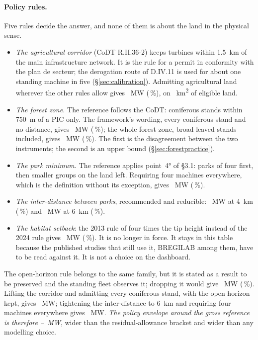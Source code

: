 \documentclass[11pt,a4paper]{article}
\begin{document}
\paragraph{Policy rules.} Five rules decide the answer, and none of them is
about the land in the physical sense.

\begin{itemize}
  \item \emph{The agricultural corridor} (CoDT R.II.36-2) keeps turbines within
    \SI{1.5}{\kilo\metre} of the main infrastructure network. It is the rule for
    a permit in conformity with the plan de secteur; the derogation route of
    D.IV.11 is used for about one standing machine in five
    (§\ref{sec:calibration}). Admitting agricultural land wherever the other
    rules allow gives \SensNoCorridorMW{}~MW (\SensNoCorridorPct{}\,\%), on
    \SensNoCorridorArea{}~\si{\square\kilo\metre} of eligible land.
  \item \emph{The forest zone.} The reference follows the CoDT: coniferous
    stands within \SI{750}{\metre} of a PIC only. The framework's wording,
    every coniferous stand and no distance, gives \SensForestConifMW{}~MW
    (\SensForestConifPct{}\,\%); the whole forest zone, broad-leaved stands
    included, gives \SensForestAllMW{}~MW (\SensForestAllPct{}\,\%). The first
    is the disagreement between the two instruments; the second is an upper
    bound (§\ref{sec:forestpractice}).
  \item \emph{The park minimum.} The reference applies point~4° of §3.1: parks
    of four first, then smaller groups on the land left. Requiring four
    machines everywhere, which is the definition without its exception, gives
    \SensParksFourMW{}~MW (\SensParksFourPct{}\,\%).
  \item \emph{The inter-distance between parks}, recommended and reducible:
    \SensIdFourMW{}~MW at 4~km (\SensIdFourPct{}\,\%) and \SensIdSixMW{}~MW at
    6~km (\SensIdSixPct{}\,\%).
  \item \emph{The habitat setback}: the 2013 rule of four times the tip height
    instead of the 2024 rule gives \SensHabitatOldMW{}~MW
    (\SensHabitatOldPct{}\,\%). It is no longer in force. It stays in this
    table because the published studies that still use it, BREGILAB among them,
    have to be read against it. It is not a choice on the dashboard.
\end{itemize}

The open-horizon rule belongs to the same family, but it is stated as a result
to be preserved and the standing fleet observes it; dropping it would give
\SensNoHorizonMW{}~MW (\SensNoHorizonPct{}\,\%). Lifting the corridor and
admitting every coniferous stand, with the open horizon kept, gives
\SensRelaxedMW{}~MW; tightening the inter-distance to 6~km and requiring four
machines everywhere gives \SensTightenedMW{}~MW. \emph{The policy envelope
around the gross reference is therefore \SensTightenedMW{}--\SensRelaxedMW{}~MW},
wider than the residual-allowance bracket and wider than any modelling choice.
\end{document}
